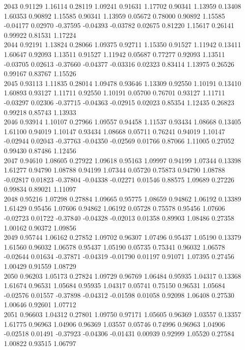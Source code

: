 {2043 0.91129 1.16114 0.28119 1.09241 0.91631 1.17702 0.90341 1.13959 0.13408 1.60353 0.90892 1.15585 0.90341 1.13959 0.05672 0.78000 0.90892 1.15585 -0.04177 0.02970 -0.37595 -0.04393 -0.03782 0.02675 0.81220 1.15617 0.26141 0.99922 0.81531 1.17224 \\
2044 0.92191 1.13824 0.28066 1.09375 0.92711 1.15350 0.91527 1.11942 0.13411 1.60647 0.92093 1.13511 0.91527 1.11942 0.05687 0.77277 0.92093 1.13511 -0.03705 0.02613 -0.37660 -0.04377 -0.03316 0.02323 0.83414 1.13975 0.26526 0.99167 0.83767 1.15526 \\
2045 0.93113 1.11835 0.28014 1.09478 0.93646 1.13309 0.92550 1.10191 0.13410 1.60893 0.93127 1.11711 0.92550 1.10191 0.05700 0.76701 0.93127 1.11711 -0.03297 0.02306 -0.37715 -0.04363 -0.02915 0.02023 0.85354 1.12435 0.26823 0.99218 0.85743 1.13933 \\
2046 0.93914 1.10107 0.27966 1.09557 0.94458 1.11537 0.93434 1.08668 0.13405 1.61100 0.94019 1.10147 0.93434 1.08668 0.05711 0.76241 0.94019 1.10147 -0.02944 0.02043 -0.37763 -0.04350 -0.02569 0.01766 0.87066 1.11005 0.27052 0.99430 0.87486 1.12456 \\
2047 0.94610 1.08605 0.27922 1.09618 0.95163 1.09997 0.94199 1.07344 0.13398 1.61277 0.94790 1.08788 0.94199 1.07344 0.05720 0.75873 0.94790 1.08788 -0.02817 0.01823 -0.37804 -0.04338 -0.02271 0.01546 0.88575 1.09689 0.27226 0.99834 0.89021 1.11097 \\
2048 0.95216 1.07298 0.27884 1.09665 0.95775 1.08659 0.94862 1.06192 0.13389 1.61429 0.95456 1.07606 0.94862 1.06192 0.05728 0.75578 0.95456 1.07606 -0.02723 0.01722 -0.37840 -0.04328 -0.02013 0.01358 0.89903 1.08486 0.27358 1.00162 0.90372 1.09856 \\
2049 0.95744 1.06162 0.27852 1.09702 0.96307 1.07496 0.95437 1.05190 0.13379 1.61560 0.96032 1.06578 0.95437 1.05190 0.05735 0.75341 0.96032 1.06578 -0.02644 0.01634 -0.37871 -0.04319 -0.01790 0.01197 0.91071 1.07395 0.27456 1.00429 0.91559 1.08729 \\
2050 0.96203 1.05173 0.27824 1.09729 0.96769 1.06484 0.95935 1.04317 0.13368 1.61674 0.96531 1.05684 0.95935 1.04317 0.05741 0.75150 0.96531 1.05684 -0.02576 0.01557 -0.37898 -0.04312 -0.01598 0.01058 0.92098 1.06408 0.27530 1.00646 0.92601 1.07712 \\
2051 0.96603 1.04312 0.27801 1.09750 0.97171 1.05605 0.96369 1.03557 0.13357 1.61775 0.96963 1.04906 0.96369 1.03557 0.05746 0.74996 0.96963 1.04906 -0.02518 0.01491 -0.37923 -0.04306 -0.01431 0.00939 0.92999 1.05520 0.27584 1.00822 0.93515 1.06797 \\
}
